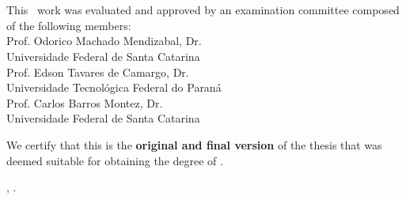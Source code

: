 \imprimircapa

\imprimirfolhaderosto

\begin{folhadeaprovacao}
	\OnehalfSpacing
	\centering
	\imprimirautor\\%
	\vspace*{10pt}		
	\textbf{\imprimirtitulo}%
	\ifnotempty{\imprimirsubtitulo}{:~\imprimirsubtitulo}\\%
	\vspace*{\baselineskip}
	This \imprimirnivel~work was evaluated and approved by an examination committee composed of the following members:\\
	\vspace*{\baselineskip}
	Prof. Odorico Machado Mendizabal, Dr.\\
	Universidade Federal de Santa Catarina\\
	\vspace*{\baselineskip}
	Prof. Edson Tavares de Camargo, Dr.\\
	Universidade Tecnológica Federal do Paraná\\
	\vspace*{\baselineskip}
	Prof. Carlos Barros Montez, Dr.\\
	Universidade Federal de Santa Catarina\\
	\vspace*{2\baselineskip}
	\begin{minipage}{\textwidth}
		We certify that this is the \textbf{original and final version} of the thesis that was deemed suitable for obtaining the degree of \imprimirformacao.\\
	\end{minipage}
	\vspace*{\fill}
	\vspace*{\fill}
	\assinatura{\OnehalfSpacing\imprimirorientador \\ \imprimirorientadorRotulo}
	\vspace*{\fill}
	\imprimirlocal, \imprimirano.
\end{folhadeaprovacao}



